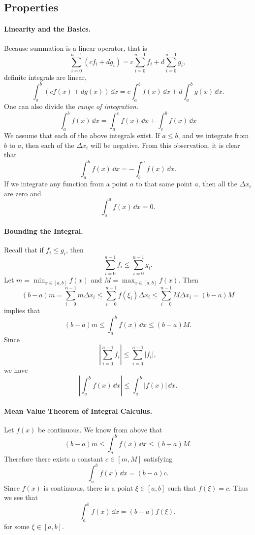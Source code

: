 \subsection{Properties}

\paragraph{Linearity and the Basics.}
Because summation is a linear operator, that is
\[
\sum_{i=0}^{n-1} (c f_i + d g_i) 
= c \sum_{i=0}^{n-1} f_i + d \sum_{i=0}^{n-1} g_i,
\]
definite integrals are linear,
\[
\int_a^b (c f(x) + d g(x))\,\dd x = c \int_a^b f(x)\,\dd x + d \int_a^b g(x) \,\dd x.
\]
One can also divide the \textit{range of integration}.
\[
\int_a^b f(x) \,\dd x = \int_a^c f(x) \,\dd x + \int_c^b f(x) \,\dd x
\]
We assume that each of the above integrals exist.  If $a \leq b$, and 
we integrate from $b$ to $a$, then each of the $\Delta x_i$ will be negative.
From this observation, it is clear that
\[
\int_a^b f(x) \,\dd x = - \int_b^a f(x) \,\dd x.
\]
If we integrate any function from a point $a$ to that same point $a$, then
all the $\Delta x_i$ are zero and 
\[
\int_a^a f(x) \,\dd x = 0.
\]





\paragraph{Bounding the Integral.}
Recall that if $f_i \leq g_i$, then
\[
\sum_{i=0}^{n-1} f_i \leq \sum_{i=0}^{n-1} g_i.
\]
Let $m = \min_{x \in [a,b]} f(x)$ and $M = \max_{x \in [a,b]} f(x)$.  Then
\[
(b-a) m = \sum_{i=0}^{n-1} m \Delta x_i 
\leq \sum_{i=0}^{n-1} f(\xi_i) \Delta x_i 
\leq \sum_{i=0}^{n-1} M \Delta x_i = (b-a) M
\]
implies that
\[
(b-a) m \leq \int_a^b f(x) \,\dd x \leq (b-a) M.
\]
Since
\[
\left| \sum_{i=0}^{n-1} f_i \right| \leq \sum_{i=0}^{n-1} |f_i|,
\]
we have
\[
\left| \int_a^b f(x) \,\dd x \right| \leq \int_a^b |f(x)| \,\dd x.
\]





\paragraph{Mean Value Theorem of Integral Calculus.}
Let $f(x)$ be continuous.  We know from above that
\[
(b-a) m \leq \int_a^b f(x) \,\dd x \leq (b-a) M.
\]
Therefore there exists a constant $c \in [m,M]$ satisfying
\[
\int_a^b f(x) \,\dd x = (b-a) c.
\]
Since $f(x)$ is continuous, there is a point $\xi \in [a,b]$ such that
$f(\xi) = c$.  Thus we see that 
\[
\int_a^b f(x) \,\dd x = (b-a) f(\xi),
\]
for some $\xi \in [a,b]$.







